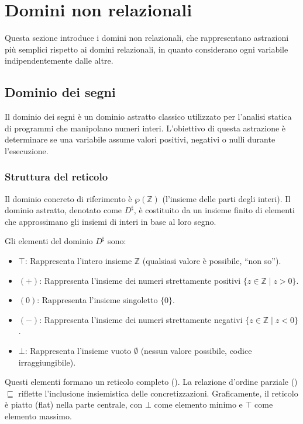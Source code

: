 \section{Domini non relazionali}

Questa sezione introduce i domini non relazionali, che rappresentano
astrazioni più semplici rispetto ai domini relazionali, in quanto
considerano ogni variabile indipendentemente dalle altre.

\subsection{Dominio dei segni}

Il dominio dei segni è un dominio astratto classico utilizzato per l'analisi
statica di programmi che manipolano numeri interi.
L'obiettivo di questa astrazione è determinare se una variabile assume valori
positivi, negativi o nulli durante l'esecuzione.

\subsubsection{Struttura del reticolo}

Il dominio concreto di riferimento è $\wp(\mathbb{Z})$ (l'insieme delle parti
degli interi).
Il dominio astratto, denotato come $D^\sharp$, è costituito da un insieme
finito di elementi che approssimano gli insiemi di interi in base al loro
segno.

Gli elementi del dominio $D^\sharp$ sono:
\begin{itemize}
    \item $\top$: Rappresenta l'intero insieme $\mathbb{Z}$ (qualsiasi valore
    è possibile, ``non so'').
    \item $(+)$: Rappresenta l'insieme dei numeri strettamente positivi
    $\{z \in \mathbb{Z} \mid z > 0\}$.
    \item $(0)$: Rappresenta l'insieme singoletto $\{0\}$.
    \item $(-)$: Rappresenta l'insieme dei numeri strettamente negativi
    $\{z \in \mathbb{Z} \mid z < 0\}$.
    \item $\bot$: Rappresenta l'insieme vuoto $\emptyset$ (nessun valore
    possibile, codice irraggiungibile).
\end{itemize}

Questi elementi formano un reticolo completo ().
La relazione d'ordine parziale () $\sqsubseteq$
riflette l'inclusione insiemistica delle concretizzazioni.
Graficamente, il reticolo è piatto (flat) nella parte centrale, con $\bot$
come elemento minimo e $\top$ come elemento massimo.

